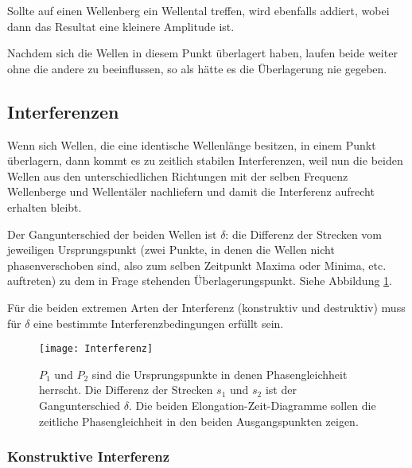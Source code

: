 Sollte auf einen Wellenberg ein Wellental treffen, wird ebenfalls addiert, wobei dann das Resultat eine kleinere Amplitude ist.

Nachdem sich die Wellen in diesem Punkt überlagert haben, laufen beide weiter ohne die andere zu beeinflussen, so als hätte es die Überlagerung nie gegeben.


\subsection{Interferenzen} \label{subsec:interferenz}

Wenn sich Wellen, die eine identische Wellenlänge besitzen, in einem Punkt überlagern, dann kommt es zu zeitlich stabilen Interferenzen, weil nun die beiden Wellen aus den unterschiedlichen Richtungen mit der selben Frequenz Wellenberge und Wellentäler \glqq nachliefern\grqq{} und damit die Interferenz aufrecht erhalten bleibt.

Der Gangunterschied der beiden Wellen ist $\delta$: die Differenz der Strecken vom jeweiligen Ursprungspunkt (zwei Punkte, in denen die Wellen nicht phasenverschoben sind, also zum selben Zeitpunkt Maxima oder Minima, etc. auftreten) zu dem in Frage stehenden Überlagerungspunkt. Siehe Abbildung \ref{fig:gangunterschied}.

Für die beiden extremen Arten der Interferenz (konstruktiv und destruktiv) muss für $\delta$ eine bestimmte Interferenzbedingungen erfüllt sein.
 
\begin{figure}[!h]
		\centering
		\texttt{[image: Interferenz]}
		\begin{comment} gnuplot './plot_noticszero.p'
set output 'plot_inteferenzhelper.png'
plot sin(x) ls 3
		\end{comment}
		\caption{$P_1$ und $P_2$ sind die Ursprungspunkte in denen Phasengleichheit herrscht. Die Differenz der Strecken $s_1$ und $s_2$ ist der Gangunterschied $\delta$. Die beiden Elongation-Zeit-Diagramme sollen die zeitliche Phasengleichheit in den beiden Ausgangspunkten zeigen.}
		\label{fig:gangunterschied}
\end{figure}

	\subsubsection{Konstruktive Interferenz}
	
